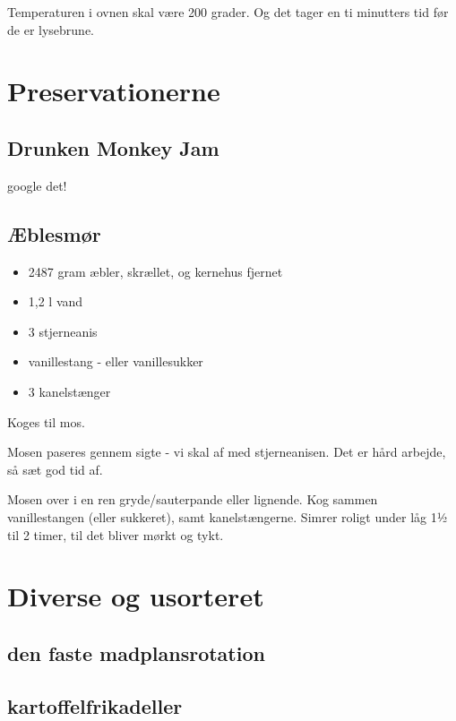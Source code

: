 \documentclass[
]{book}
\providecommand{\tightlist}{%
  \setlength{\itemsep}{0pt}\setlength{\parskip}{0pt}}
\begin{document}
Temperaturen i ovnen skal være 200 grader. Og det tager en ti minutters tid før de er lysebrune.

\chapter{Preservationerne}\label{preservationerne}

\section{Drunken Monkey Jam}\label{drunken-monkey-jam}

google det!

\section{Æblesmør}\label{uxe6blesmuxf8r}

\begin{itemize}
\tightlist
\item
  2487 gram æbler, skrællet, og kernehus fjernet
\item
  1,2 l vand
\item
  3 stjerneanis
\item
  vanillestang - eller vanillesukker
\item
  3 kanelstænger
\end{itemize}

Koges til mos.

Mosen paseres gennem sigte - vi skal af med stjerneanisen.
Det er hård arbejde, så sæt god tid af.

Mosen over i en ren gryde/sauterpande eller lignende.
Kog sammen vanillestangen (eller sukkeret), samt kanelstængerne.
Simrer roligt under låg 1½ til 2 timer, til det bliver mørkt og tykt.

\chapter{Diverse og usorteret}\label{diverse-og-usorteret}

\section{den faste madplansrotation}\label{den-faste-madplansrotation}

\section{kartoffelfrikadeller}\label{kartoffelfrikadeller}
\end{document}
